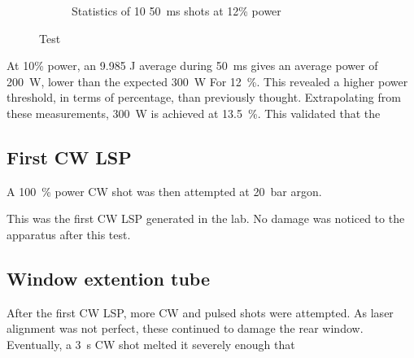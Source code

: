 \begin{figure}[h]
\begin{subfigure}[t]{0.45\textwidth}
                    \caption{Statistics of 10 \qty{50}{ms} shots at 12\% power}
                \end{subfigure}
                \caption{Test}
            \end{figure}
            
            At 10\% power, an 9.985 J average during \qty{50}{ms} gives an average power of \qty{200}{W}, lower than the expected \qty{300}{W} For \qty{12}{\%}. This revealed a higher power threshold, in terms of percentage, than previously thought. Extrapolating from these measurements, \qty{300}{W} is achieved at \qty{13.5}{\%}. This validated that the 

        \subsection{First CW LSP}
            
            A \qty{100}{\%} power CW shot was then attempted at \qty{20}{bar} argon. 


            This was the first CW LSP generated in the lab. No damage was noticed to the apparatus after this test.

        \subsection{Window extention tube}
            
            After the first CW LSP, more CW and pulsed shots were attempted. As laser alignment was not perfect, these continued to damage the rear window. Eventually, a \qty{3}{s} CW shot melted it severely enough that 

